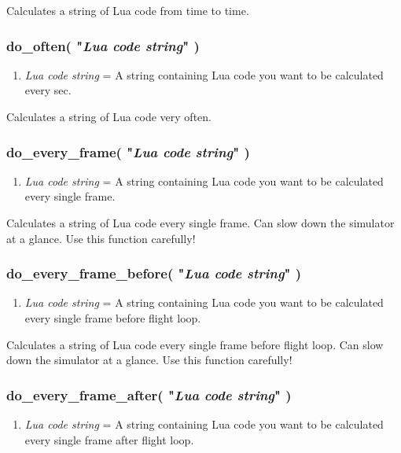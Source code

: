 \documentclass[11pt,parskip=half,a4paper]{scrartcl}
\begin{document}
Calculates a string of Lua code from time to time.

\subsubsection{do\_often( "\emph{Lua code string}" )}

\begin{enumerate}
	\item \emph{Lua code string} = A string containing Lua code you want to be calculated every sec.
\end{enumerate}

Calculates a string of Lua code very often.

\subsubsection{do\_every\_frame( "\emph{Lua code string}" )}

\begin{enumerate}
	\item \emph{Lua code string} = A string containing Lua code you want to be calculated every single frame.
\end{enumerate}

Calculates a string of Lua code every single frame. Can slow down the simulator at a glance. Use this function carefully!


\subsubsection{do\_every\_frame\_before( "\emph{Lua code string}" )}

\begin{enumerate}
	\item \emph{Lua code string} = A string containing Lua code you want to be calculated every single frame before flight loop.
\end{enumerate}

Calculates a string of Lua code every single frame before flight loop. Can slow down the simulator at a glance. Use this function carefully!

\subsubsection{do\_every\_frame\_after( "\emph{Lua code string}" )}

\begin{enumerate}
	\item \emph{Lua code string} = A string containing Lua code you want to be calculated every single frame after flight loop.
\end{enumerate}
\end{document}
